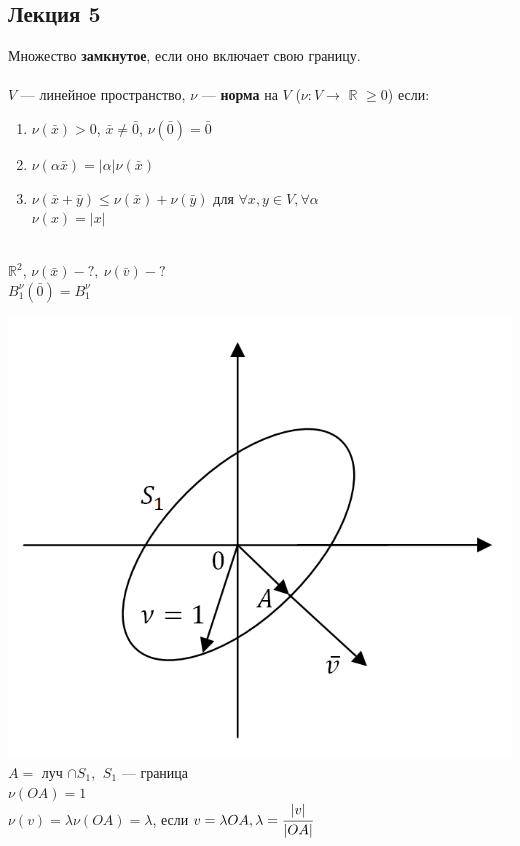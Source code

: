 \documentclass[a4paper,12pt]{article}
\begin{document}
\begin{defintion}
\section *{Лекция 5}
\noindent Множество \textbf{замкнутое}, если оно включает свою границу.\\ \\
$V$ --- линейное пространство, $\nu$ --- \textbf{норма} на $V$ ($\nu : V \to$ $\mathbb{R}$ $\geqslant 0$) если:\begin{enumerate}
	\item $\nu(\bar x) > 0$, $\bar x \neq \bar 0$, $\nu(\bar 0) = \bar 0$
	\item $\nu(\alpha \bar x) = |\alpha|\nu(\bar x)$
	\item $\nu(\bar x + \bar y) \leq \nu(\bar x) + \nu(\bar y)$ для $\forall x, y \in V, \forall \alpha$\\
	$\nu (x) = |x|$\end{enumerate}
~\\
$\mathbb{R}^2$, $\nu(\bar x) - ?,~ \nu(\bar v ) - ?$\\
$B_1^{\nu}(\bar 0) = B_1^{\nu}$\begin{center}\includegraphics[scale=0.6]{l5_2.png}\\
	$A = $ луч $ \cap S_1$, $~S_1$ --- граница\\
	$\nu(OA) = 1$\\
	$\nu(v) = \lambda \nu(OA) = \lambda$, если $v = \lambda OA, \lambda = \cfrac{|v|}{|OA|}$
\end{center}

\end{defintion}
\end{document}
